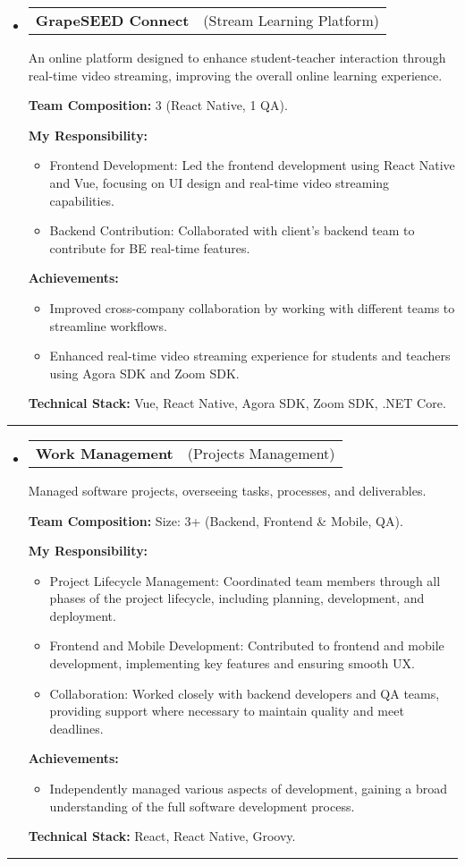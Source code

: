 \documentclass[letterpaper,11pt]{article}
\makeatletter
\newcommand{\resumeProjectTitle}[2]{
  \vspace{-2pt}\item
    \begin{tabular*}{1\textwidth}[t]{l @{\hskip 2pt} r}
      \textbf{#1} & \small #2 \\
    \end{tabular*}\vspace{2pt}
}
\newcommand{\resumeDesc}[1]{
  {#1\\ \vspace{0px}}
}
\newcommand{\resumeItem}[1]{
  \item{#1 \vspace{-2pt}}
}
\newcommand{\resumeItemListTitle}[1]{%
  \vspace{4pt} \textbf{#1} \vspace{-2pt}%
}
\newcommand{\resumeItemListStart}{\vspace{-4pt}\begin{itemize}[leftmargin=12px]}
\newcommand{\resumeItemListEnd}{\end{itemize}\vspace{-5pt}}
\newcommand{\resumeSubHeadingListStart}{\begin{itemize}[leftmargin=0pt, label={}]}
\newcommand{\resumeSubHeadingListEnd}{\end{itemize}\vspace{-5pt}}
\makeatother
\begin{document}
\resumeSubHeadingListStart
\resumeProjectTitle{GrapeSEED Connect}{(Stream Learning Platform)}
\resumeDesc{An online platform designed to enhance student-teacher interaction through real-time video streaming, improving the overall online learning experience.}
\resumeItemListTitle{Team Composition:} 3 (React Native, 1 QA).
\par
\resumeItemListTitle{My Responsibility:}
\resumeItemListStart
    \resumeItem{Frontend Development: Led the frontend development using React Native and Vue, focusing on UI design and real-time video streaming capabilities.}
    \resumeItem{Backend Contribution: Collaborated with client's backend team to contribute for BE real-time features.}
\resumeItemListEnd
\resumeItemListTitle{Achievements:}
\resumeItemListStart
    \resumeItem{Improved cross-company collaboration by working with different teams to streamline workflows.}
    \resumeItem{Enhanced real-time video streaming experience for students and teachers using Agora SDK and Zoom SDK.}
\resumeItemListEnd
\resumeItemListTitle{Technical Stack:} Vue, React Native, Agora SDK, Zoom SDK, .NET Core.
\resumeSubHeadingListEnd
\noindent\rule{\textwidth}{0.4pt}

\resumeSubHeadingListStart
\resumeProjectTitle{Work Management}{(Projects Management)}
\resumeDesc{Managed software projects, overseeing tasks, processes, and deliverables.}
\resumeItemListTitle{Team Composition:} Size: 3+ (Backend, Frontend & Mobile, QA).
\par
\resumeItemListTitle{My Responsibility:}
\resumeItemListStart
    \resumeItem{Project Lifecycle Management: Coordinated team members through all phases of the project lifecycle, including planning, development, and deployment.}
    \resumeItem{Frontend and Mobile Development: Contributed to frontend and mobile development, implementing key features and ensuring smooth UX.}
    \resumeItem{Collaboration: Worked closely with backend developers and QA teams, providing support where necessary to maintain quality and meet deadlines.}
\resumeItemListEnd
\resumeItemListTitle{Achievements:}
\resumeItemListStart
    \resumeItem{Independently managed various aspects of development, gaining a broad understanding of the full software development process.}
\resumeItemListEnd
\resumeItemListTitle{Technical Stack:} React, React Native, Groovy.
\resumeSubHeadingListEnd
\noindent\rule{\textwidth}{0.4pt}
\end{document}
